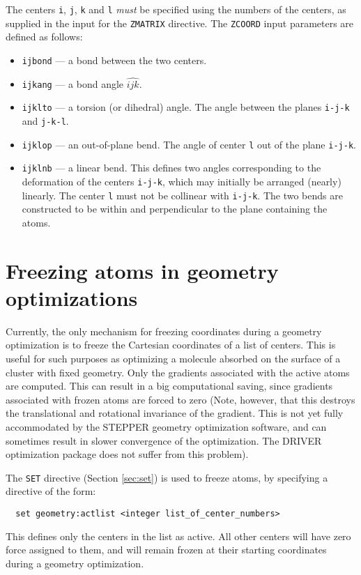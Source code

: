 The centers \verb+i+, \verb+j+, \verb+k+ and \verb+l+ {\em must}
be specified using the numbers of the centers, as supplied in the input
for the \verb+ZMATRIX+ directive.  
The \verb+ZCOORD+ input parameters are defined as follows:

\begin{itemize}
\item {\tt ijbond} --- a bond between the two centers.
\item {\tt ijkang} --- a bond angle $\widehat{ijk}$.
\item {\tt ijklto} --- a torsion (or dihedral) angle.  The
  angle between the planes \verb+i-j-k+ and \verb+j-k-l+.
\item {\tt ijklop} --- an out-of-plane bend.  The angle of center
  \verb+l+ out of the plane \verb+i-j-k+.
\item {\tt ijklnb} --- a linear bend.  This defines two angles
  corresponding to the deformation of the centers \verb+i-j-k+,
  which may initially be arranged (nearly) linearly.  The center
  \verb+l+ must not be collinear with \verb+i-j-k+.  The two bends are constructed to be
  within and perpendicular to the plane containing the atoms.
\end{itemize}   

\section{Freezing atoms in geometry optimizations}
\label{sec:activeatoms}

Currently, the only mechanism for freezing coordinates during a
geometry optimization is to freeze the Cartesian coordinates of a list
of centers.  This is useful for such purposes as optimizing a molecule
absorbed on the surface of a cluster with fixed geometry.  Only the
gradients associated with the active atoms are computed.  This can
result in a big computational saving, since gradients associated with
frozen atoms are forced to zero (Note, however, that this destroys the
translational and rotational invariance of the gradient.  This is not
yet fully accommodated by the STEPPER geometry optimization software,
and can sometimes result in slower convergence of the optimization.
The DRIVER optimization package does not suffer from this problem).

The \verb+SET+ directive (Section \ref{sec:set}) is used to freeze
atoms, by specifying a directive of the form:
\begin{verbatim}
  set geometry:actlist <integer list_of_center_numbers>
\end{verbatim}
This defines only the centers in the list as active.  All other
centers will have zero force assigned to them, and will remain frozen
at their starting coordinates during a geometry optimization.

